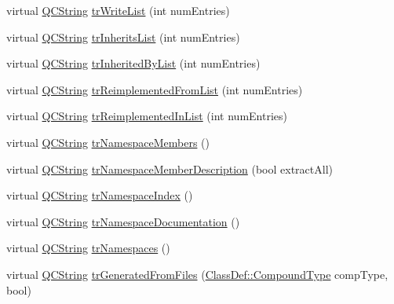 \begin{DoxyCompactItemize}
virtual \mbox{\hyperlink{class_q_c_string}{Q\+C\+String}} \mbox{\hyperlink{class_translator_chinesetraditional_a173a9add6c2a074ea0b69e02c58ab105}{tr\+Write\+List}} (int num\+Entries)
\item 
virtual \mbox{\hyperlink{class_q_c_string}{Q\+C\+String}} \mbox{\hyperlink{class_translator_chinesetraditional_a87374f3d1f0381391d6bc2841281353f}{tr\+Inherits\+List}} (int num\+Entries)
\item 
virtual \mbox{\hyperlink{class_q_c_string}{Q\+C\+String}} \mbox{\hyperlink{class_translator_chinesetraditional_a39a3b2bb06ce928b00ccd3425cb51015}{tr\+Inherited\+By\+List}} (int num\+Entries)
\item 
virtual \mbox{\hyperlink{class_q_c_string}{Q\+C\+String}} \mbox{\hyperlink{class_translator_chinesetraditional_a4123a9a2bd28068e475392efd4651c42}{tr\+Reimplemented\+From\+List}} (int num\+Entries)
\item 
virtual \mbox{\hyperlink{class_q_c_string}{Q\+C\+String}} \mbox{\hyperlink{class_translator_chinesetraditional_aca576368f45551caeec96ea9d69ec408}{tr\+Reimplemented\+In\+List}} (int num\+Entries)
\item 
virtual \mbox{\hyperlink{class_q_c_string}{Q\+C\+String}} \mbox{\hyperlink{class_translator_chinesetraditional_a3aec65a28c2b177db121ad1645413e3b}{tr\+Namespace\+Members}} ()
\item 
virtual \mbox{\hyperlink{class_q_c_string}{Q\+C\+String}} \mbox{\hyperlink{class_translator_chinesetraditional_a171a9f55c053e186ccbdeb618926078c}{tr\+Namespace\+Member\+Description}} (bool extract\+All)
\item 
virtual \mbox{\hyperlink{class_q_c_string}{Q\+C\+String}} \mbox{\hyperlink{class_translator_chinesetraditional_a29d1791d96691ceb1290847ff865ca83}{tr\+Namespace\+Index}} ()
\item 
virtual \mbox{\hyperlink{class_q_c_string}{Q\+C\+String}} \mbox{\hyperlink{class_translator_chinesetraditional_a8921d97e025593ea1bf75e5154f184e8}{tr\+Namespace\+Documentation}} ()
\item 
virtual \mbox{\hyperlink{class_q_c_string}{Q\+C\+String}} \mbox{\hyperlink{class_translator_chinesetraditional_abbf6cde3ca2bb82a800469df5956a5fb}{tr\+Namespaces}} ()
\item 
virtual \mbox{\hyperlink{class_q_c_string}{Q\+C\+String}} \mbox{\hyperlink{class_translator_chinesetraditional_a2409b760dbc895ccd60b3d2c13c532b9}{tr\+Generated\+From\+Files}} (\mbox{\hyperlink{class_class_def_ae70cf86d35fe954a94c566fbcfc87939}{Class\+Def\+::\+Compound\+Type}} comp\+Type, bool)

\end{DoxyCompactItemize}
